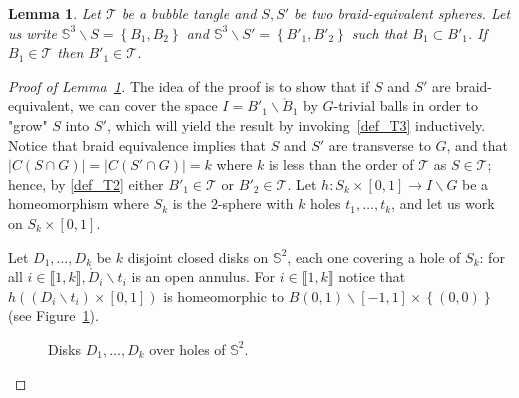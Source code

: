 \documentclass[11pt,a4paper]{article}
\newcommand\ens[1]{\left\{ #1 \right\}}
\newcommand\inter[2]{\llbracket #1,#2 \rrbracket}
\newcommand{\Sp}{\mathbb S}
\newcommand{\T}{\mathcal{T}}
\newtheorem{lem}[theorem]{Lemma}
\begin{document}
\begin{lem}\label{lem_braid_equi}
Let $\T$ be a bubble tangle and $S,S'$ be two braid-equivalent spheres. Let us write $\Sp^3 \smallsetminus S = \ens{B_1,B_2}$ and $\Sp^3 \smallsetminus S' = \ens{B'_1,B'_2}$ such that $B_1 \subset B'_1$. If $B_1 \in \T$ then $B'_1 \in \T$.
\end{lem}

\begin{proof}[Proof of Lemma~\ref{lem_braid_equi}]
 The idea of the proof is to show that if $S$ and $S'$ are braid-equivalent, we can cover the space $I = B'_1 \smallsetminus  \mathring B_1$ by $G$-trivial balls in order to "grow" $S$ into $S'$, which will yield the result by invoking~\ref{def_T3} inductively. Notice that braid equivalence implies that $S$ and $S'$ are transverse to $G$, and that $|C(S \cap G)| = |C(S' \cap G)| = k$ where $k$ is less than the order of $\T$ as $S \in \T$; hence, by \ref{def_T2} either $B'_1 \in \T$ or $B'_2 \in \T$. Let $h :S_k \times [0,1] \rightarrow I \smallsetminus G$ be a homeomorphism where $S_k$ is the $2$-sphere with $k$ holes $t_1, \ldots, t_k$, and let us work on $S_k \times [0,1]$.

  
Let $D_1, \ldots, D_k$ be $k$ disjoint closed disks on $\Sp^2$, each one covering a hole of $S_k$: for all $i \in \inter{1}{k}, \mathring D_i \smallsetminus t_i$ is an open annulus. For $i \in \inter{1}{k}$ notice that $h((D_i \smallsetminus t_i) \times [0,1])$ is homeomorphic to $B(0,1) \smallsetminus [-1,1]\times \ens{(0,0)}$ (see Figure~\ref{pic_disks}).


\begin{figure}[h]
\begin{center}
\caption{Disks $D_1, \ldots, D_k$ over holes of $\Sp^2$.}
\label{pic_disks}
\end{center}
\end{figure}


\end{proof}
\end{document}
